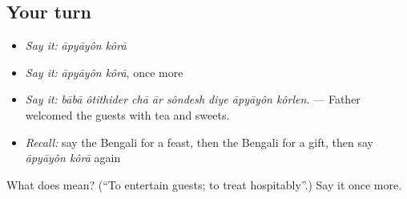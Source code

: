 \subsection*{Your turn}
\begin{itemize}
\raggedright
  \item \emph{Say it:} \emph{āpyāyôn kôrā}
  \item \emph{Say it:} \emph{āpyāyôn kôrā}, once more
  \item \emph{Say it:} \emph{bābā ôtithider chā ār sôndesh diye āpyāyôn kôrlen.} — Father welcomed the guests with tea and sweets.
  \item \emph{Recall:} say the Bengali for a feast, then the Bengali for a gift, then say \emph{āpyāyôn kôrā} again
\end{itemize}

\begin{tcolorbox}[breakable,colback=teal!4,colframe=teal!35!black,title={Before you move on}]
What does   mean? (\textquotedblleft{}To entertain guests; to treat hospitably\textquotedblright{}.) Say it once more.
\end{tcolorbox}

